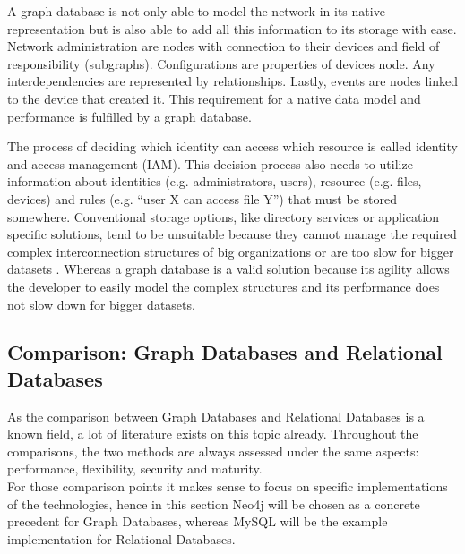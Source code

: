 A graph database is not only able to model the network in its native representation but is also able to add all this information to its storage with ease. Network administration are nodes with connection to their devices and field of responsibility (subgraphs). Configurations are properties of devices node. Any interdependencies are represented by relationships. Lastly, events are nodes linked to the device that created it. This requirement for a native data model and performance is fulfilled by a graph database.


The process of deciding which identity can access which resource is called identity and access management (IAM). This decision process also needs to utilize information about identities (e.g.  administrators, users), resource (e.g.  files, devices) and rules (e.g. “user X can access file Y”) that must be stored somewhere. Conventional storage options, like directory services or application specific solutions, tend to be unsuitable because they cannot manage the required complex interconnection structures of big organizations or are too slow for bigger datasets \autocite{neo4j:use_cases}.  Whereas a graph database is a valid solution because its agility allows the developer to easily model the complex structures and its performance does not slow down for bigger datasets.


\subsection{Comparison: Graph Databases and Relational Databases} \label{section:comparison}
As the comparison between Graph Databases and Relational Databases is a known field, a lot of literature exists on this topic already. Throughout the comparisons, the two methods are always assessed under the same aspects: performance, flexibility, security and maturity. \\
For those comparison points it makes sense to focus on specific implementations of the technologies, hence in this section Neo4j will be chosen as a concrete precedent for Graph Databases, whereas MySQL will be the example implementation for Relational Databases.

